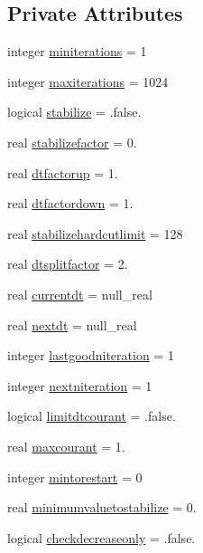 \subsection*{Private Attributes}
\begin{DoxyCompactItemize}
\item 
integer \mbox{\hyperlink{structmodulerunoff_1_1t__converge_ac22b418ea0ce2812c7da4205bd83faeb}{miniterations}} = 1
\item 
integer \mbox{\hyperlink{structmodulerunoff_1_1t__converge_a1e765472a7c68bbaf999d87b42572d67}{maxiterations}} = 1024
\item 
logical \mbox{\hyperlink{structmodulerunoff_1_1t__converge_a1a06dc97f8a645f678ed606388009f0d}{stabilize}} = .false.
\item 
real \mbox{\hyperlink{structmodulerunoff_1_1t__converge_ab0e67cf5df6697c560573795cf42b822}{stabilizefactor}} = 0.
\item 
real \mbox{\hyperlink{structmodulerunoff_1_1t__converge_a07fac12a14ee08a7cb6c7041f1e598e0}{dtfactorup}} = 1.
\item 
real \mbox{\hyperlink{structmodulerunoff_1_1t__converge_ab3ba089c18ca6fb37e98c0aaf563c52a}{dtfactordown}} = 1.
\item 
real \mbox{\hyperlink{structmodulerunoff_1_1t__converge_a4678786c2822df8f831fe90af4a018a8}{stabilizehardcutlimit}} = 128
\item 
real \mbox{\hyperlink{structmodulerunoff_1_1t__converge_a24b3ae64d621ae07710a3bc87ea573e3}{dtsplitfactor}} = 2.
\item 
real \mbox{\hyperlink{structmodulerunoff_1_1t__converge_ab7b952a56d84ab88a41985caf4a7dbbf}{currentdt}} = null\+\_\+real
\item 
real \mbox{\hyperlink{structmodulerunoff_1_1t__converge_aaea0cc9ad20db3528a72cb0148a08329}{nextdt}} = null\+\_\+real
\item 
integer \mbox{\hyperlink{structmodulerunoff_1_1t__converge_a8b8b7e5cbbc1c0b160b97b3ca2f4df81}{lastgoodniteration}} = 1
\item 
integer \mbox{\hyperlink{structmodulerunoff_1_1t__converge_a5bdd756a6c9f7bf0201a0b6cfa3898dd}{nextniteration}} = 1
\item 
logical \mbox{\hyperlink{structmodulerunoff_1_1t__converge_aa0490821091eae76840a8342f8bd54ea}{limitdtcourant}} = .false.
\item 
real \mbox{\hyperlink{structmodulerunoff_1_1t__converge_aebe327fe9a81cea0585cc66cd3efb81c}{maxcourant}} = 1.
\item 
integer \mbox{\hyperlink{structmodulerunoff_1_1t__converge_a3aa7df0478e7c2ee8c6aa6a81f216644}{mintorestart}} = 0
\item 
real \mbox{\hyperlink{structmodulerunoff_1_1t__converge_a7f9193ac5a8f37012011f4609abefa28}{minimumvaluetostabilize}} = 0.
\item 
logical \mbox{\hyperlink{structmodulerunoff_1_1t__converge_a3f1ff5138c015b6ceac6f21812021481}{checkdecreaseonly}} = .false.
\end{DoxyCompactItemize}


